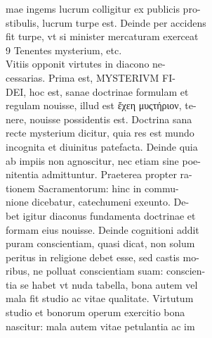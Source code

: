 \documentclass{article}
\begin{document}
\begin{pages}
                mae ingems lucrum colligitur ex publicis pro- \\
                stibulis, lucrum turpe est. Deinde per accidens \\
                fit turpe, vt si minister mercaturam exerceat \\
                9 Tenentes mysterium, etc. \\
                Vitiis opponit virtutes in diacono ne- \\
                cessarias. Prima est, MYSTERIVM FI- \\
                DEI, hoc est, sanae doctrinae formulam et \\
                regulam nouisse, illud est ἔχεη μυςτήριον, te- \\
                nere, nouisse possidentis est. Doctrina sana \\
                recte mysterium dicitur, quia res est mundo \\
                incognita et diuinitus patefacta. Deinde quia \\
                ab impiis non agnoscitur, nec etiam sine poe- \\
                nitentia admittuntur. Praeterea propter ra- \\
                tionem Sacramentorum: hinc in commu- \\
                nione dicebatur, catechumeni exeunto. De- \\
                bet igitur diaconus fundamenta doctrinae et \\
                formam eius nouisse. Deinde cognitioni addit \\
                puram conscientiam, quasi dicat, non solum \\
                peritus in religione debet esse, sed castis mo- \\
                ribus, ne polluat conscientiam suam: conscien- \\
                tia se habet vt nuda tabella, bona autem vel \\
                mala fit studio ac vitae qualitate. Virtutum \\
                studio et bonorum operum exercitio bona \\
                nascitur: mala autem vitae petulantia ac im \\

\end{pages}
\end{document}
